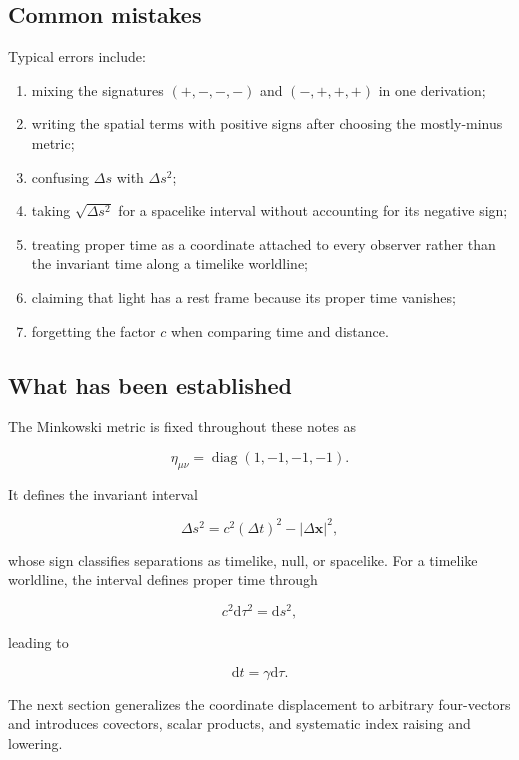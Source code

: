 \subsection{Common mistakes}

Typical errors include:

\begin{enumerate}
    \item mixing the signatures \((+,-,-,-)\) and \((-,+,+,+)\) in one derivation;
    \item writing the spatial terms with positive signs after choosing the mostly-minus metric;
    \item confusing \(\Delta s\) with \(\Delta s^{2}\);
    \item taking \(\sqrt{\Delta s^{2}}\) for a spacelike interval without accounting for its negative sign;
    \item treating proper time as a coordinate attached to every observer rather than the invariant time along a timelike worldline;
    \item claiming that light has a rest frame because its proper time vanishes;
    \item forgetting the factor \(c\) when comparing time and distance.
\end{enumerate}

\subsection{What has been established}

The Minkowski metric is fixed throughout these notes as

\[
\eta_{\mu\nu}
=
\operatorname{diag}(1,-1,-1,-1).
\]

It defines the invariant interval

\[
\Delta s^{2}
=
c^{2}(\Delta t)^{2}
-
|\Delta\mathbf{x}|^{2},
\]

whose sign classifies separations as timelike, null, or spacelike. For a timelike worldline, the interval defines proper time through

\[
c^{2}\mathrm{d}\tau^{2}=\mathrm{d}s^{2},
\]

leading to

\[
\mathrm{d}t=\gamma\mathrm{d}\tau.
\]

The next section generalizes the coordinate displacement to arbitrary four-vectors and introduces covectors, scalar products, and systematic index raising and lowering.